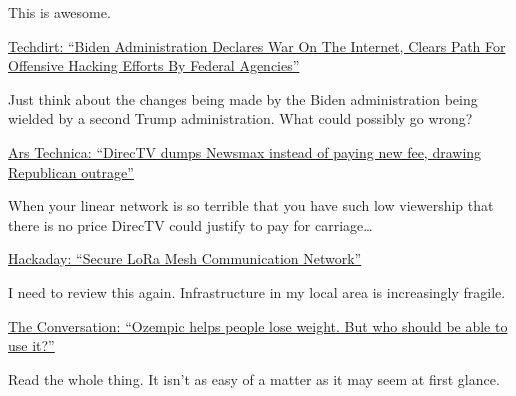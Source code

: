 This is awesome.

\href{https://www.techdirt.com/2023/01/27/biden-administration-declares-war-on-the-internet-clears-path-for-offensive-hacking-efforts-by-federal-agencies/}{Techdirt:
``Biden Administration Declares War On The Internet, Clears Path For
Offensive Hacking Efforts By Federal Agencies''}

Just think about the changes being made by the Biden administration
being wielded by a second Trump administration. What could possibly go
wrong?

\href{https://arstechnica.com/?p=1912543}{Ars Technica: ``DirecTV dumps
Newsmax instead of paying new fee, drawing Republican outrage''}

When your linear network is so terrible that you have such low
viewership that there is no price DirecTV could justify to pay for
carriage\ldots{}

\href{https://hackaday.com/2023/01/25/secure-lora-mesh-communication-network/}{Hackaday:
``Secure LoRa Mesh Communication Network''}

I need to review this again. Infrastructure in my local area is
increasingly fragile.

\href{https://theconversation.com/ozempic-helps-people-lose-weight-but-who-should-be-able-to-use-it-196794}{The
Conversation: ``Ozempic helps people lose weight. But who should be able
to use it?''}

Read the whole thing. It isn't as easy of a matter as it may seem at
first glance.
